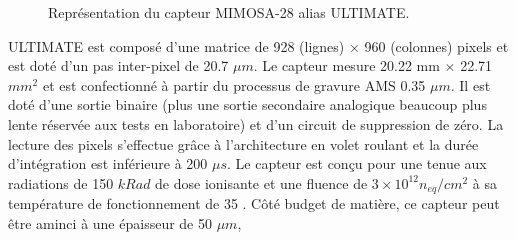   \begin{figure}[!htb]
   \begin{center}
   \caption{Repr\'esentation du capteur MIMOSA-28 alias ULTIMATE.}
   \label{fig:Ultimate}
   \end{center}
  \end{figure}

   \medskip
  
   ULTIMATE est compos\'e d'une matrice de 928 (lignes) $\times$ 960 (colonnes) pixels et est dot\'e d'un pas inter-pixel de 20.7 $\mu m$. Le capteur mesure 20.22 mm $\times$ 22.71 $mm^2$ et est confectionn\'e \`a partir du processus de gravure AMS 0.35 $\mu m$. Il est dot\'e d'une sortie binaire (plus une sortie secondaire analogique beaucoup plus lente r\'eserv\'ee aux tests en laboratoire) et d'un circuit de suppression de z\'ero. La lecture des pixels s'effectue gr\^ace \`a l'architecture en volet roulant et la dur\'ee d'int\'egration est inf\'erieure \`a 200 $\mu s$. Le capteur est con\c{c}u pour une tenue aux radiations de 150 $kRad$ de dose ionisante et une fluence de $3 \times 10^{12} n_{eq}/cm^2$ \`a sa temp\'erature de fonctionnement de 35 \textcelsius. Côt\'e budget de mati\`ere, ce capteur peut \^etre aminci \`a une \'epaisseur de 50 $\mu m$, 
  
